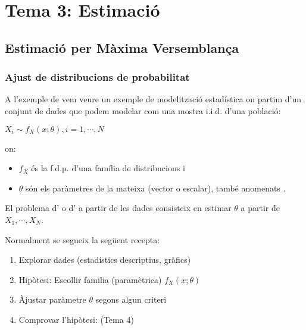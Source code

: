 \documentclass[letterpaper,10pt,english]{sphinxmanual}
\begin{document}
\chapter{Tema 3: Estimació}
\label{\detokenize{0_Intro/0_3_Estimacio:tema-3-estimacio}}\label{\detokenize{0_Intro/0_3_Estimacio::doc}}

\section{Estimació per Màxima Versemblança}
\label{\detokenize{0_Intro/0_3_Estimacio:estimacio-per-maxima-versemblanca}}

\subsection{Ajust de distribucions de probabilitat}
\label{\detokenize{0_Intro/0_3_Estimacio:ajust-de-distribucions-de-probabilitat}}
A l’exemple de 
vem veure un exemple de modelització estadística on
partim d’un conjunt de dades que podem modelar com
una mostra i.i.d. d’una població:

\(X_i \sim f_X(x;\theta), i=1,\cdots,N\)

on:
\begin{itemize}
\item {} 
\(f_X\) és la f.d.p. d’una família de distribucions i

\item {} 
\(\theta\) són els paràmetres de la mateixa (vector o escalar), també anomenats .

\end{itemize}

El problema d’ o d’ a partir de les dades
consisteix en estimar \(\theta\) a partir de \(X_1, \cdots, X_N\).

Normalment se segueix la següent recepta:
\begin{enumerate}
%
\item {} 
Explorar dades (estadístics descriptius, gràfics)

\item {} 
Hipòtesi: Escollir familia (paramètrica) \(f_X(x;\theta)\)

\item {} 
Àjustar paràmetre \(\theta\) segons algun criteri

\item {} 
Comprovar l’hipòtesi:  (Tema 4)

\end{enumerate}
\end{document}
